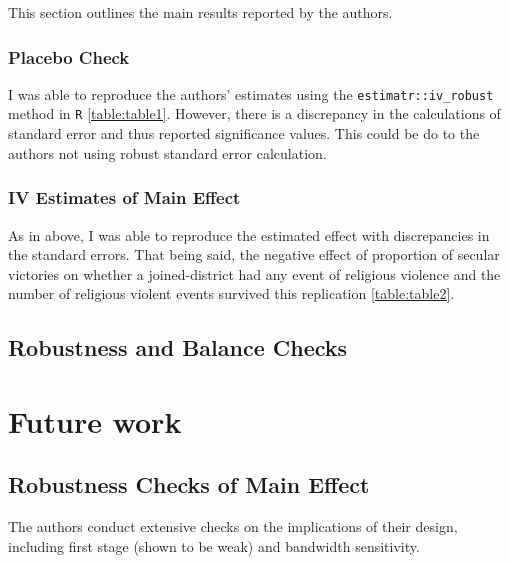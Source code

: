 \documentclass{scrartcl}
\begin{document}
This section outlines the main results reported by the authors. 

\subsubsection{Placebo Check}



I was able to reproduce the authors' estimates using the \texttt{estimatr::iv\_robust} method in \texttt{R} \ref{table:table1}. However, there is a discrepancy in the calculations of standard error and thus reported significance values. This could be do to the authors not using robust standard error calculation. 


\subsubsection{IV Estimates of Main Effect}

As in above, I was able to reproduce the estimated effect with discrepancies in the standard errors. That being said, the negative effect of proportion of secular victories on whether a joined-district had any event of religious violence and the number of religious violent events survived this replication \ref{table:table2}. 

\begin{center}
\footnotesize 
\end{center}{}
\begin{center}
\footnotesize 
\end{center}{}
\begin{center}
\footnotesize 
\end{center}{}
\subsection{Robustness and Balance Checks}

\section{Future work}

\subsection{Robustness Checks of Main Effect}

The authors conduct extensive checks on the implications of their design, including first stage (shown to be weak) and bandwidth sensitivity. 
\end{document}
